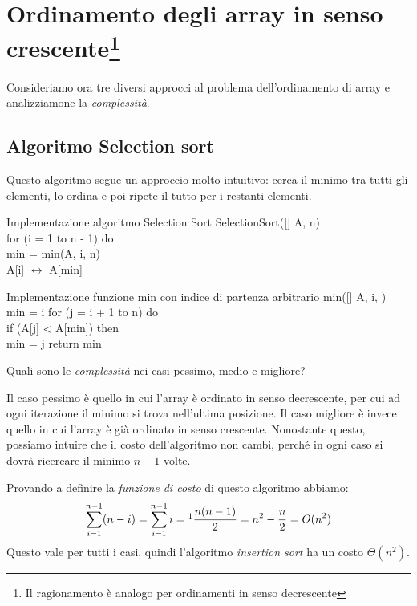 \section[Ordinamento degli array in senso crescente]
{Ordinamento degli array in senso crescente\footnote{Il ragionamento è
analogo per ordinamenti in senso decrescente}}
Consideriamo ora tre diversi approcci al problema dell'ordinamento di array e
analizziamone la \emph{complessità}.

\subsection{Algoritmo Selection sort}
Questo algoritmo segue un approccio molto intuitivo: cerca il minimo tra tutti gli
elementi, lo ordina e poi ripete il tutto per i restanti elementi.

\begin{code}{Implementazione algoritmo Selection Sort}
\noindent\rmbreak\ind SelectionSort([] A,  n)\\
    \ind for (i = 1 to n - 1) do\\
        \indf{} min = min(A, i, n)\\
        \indf A[i] $\leftrightarrow$ A[min]\hfill{}    
\end{code}
\vspace{-2\lineheight}
\begin{code}{Implementazione funzione min con indice di partenza arbitrario}
\noindent\rmbreak\ind{} min([] A,  i, )\\
     min = i\hfill{}
    for (j = i + 1 to n) do\\
        \indf if (A[j] < A[min]) then\\
            \indff min = j\hfill{}
    \ind return min
\end{code}\noindent
Quali sono le \emph{complessità} nei casi pessimo, medio e migliore?

\bigskip\noindent
Il caso pessimo è quello in cui l'array è ordinato in senso decrescente,
per cui ad ogni iterazione il minimo si trova nell'ultima posizione.
Il caso migliore è invece quello in cui l'array è già ordinato in senso crescente.
Nonostante questo, possiamo intuire che il costo dell'algoritmo non cambi, perché
in ogni caso si dovrà ricercare il minimo $n-1$ volte.

\bigskip\noindent
Provando a definire la \emph{funzione di costo} di questo algoritmo abbiamo:
\[\sum_{i=1}^{n-1}(n-i)=\sum_{i=1}^{n-1}i=\footnotemark\frac{n(n-1)}
{2}=n^2-\frac{n}{2}=O(n^2)\]
Questo vale per tutti i casi, quindi l'algoritmo \emph{insertion sort} ha un
costo $\Theta(n^2)$.


